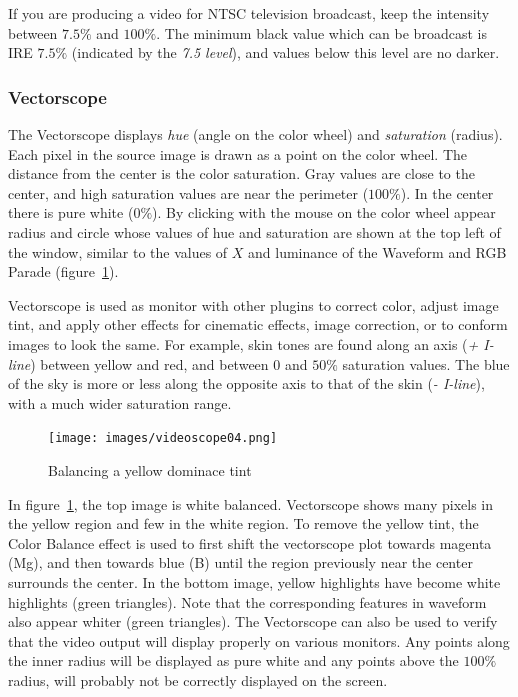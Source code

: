 {If you are producing a video for NTSC television broadcast, keep the intensity between $7.5\%$ and $100\%$. The minimum black value which can be broadcast is IRE $7.5\%$ (indicated by the \textit{7.5 level}), and values below this level are no darker.

\subsubsection*{Vectorscope}%
\label{ssub:Vectorscope}

The Vectorscope displays \textit{hue} (angle on the color wheel) and \textit{saturation} (radius). Each pixel in the source image is drawn as a point on the color wheel. The distance from the center is the color saturation. Gray values are close to the center, and high saturation values are near the perimeter ($100\%$). In the center there is pure white ($0\%$). By clicking with the mouse on the color wheel appear radius and circle whose values of hue and saturation are shown at the top left of the window, similar to the values of $X$ and luminance of the Waveform and RGB Parade (figure~\ref{fig:videoscope04}).

Vectorscope is used as monitor with other plugins to correct color, adjust image tint, and apply other effects for cinematic effects, image correction, or to conform images to look the same. For example, skin tones are found along an axis (\textit{+ I-line}) between yellow and red, and between $0$ and $50\%$ saturation values. The blue of the sky is more or less along the opposite axis to that of the skin (\textit{- I-line}), with a much wider saturation range.

\begin{figure}[hbtp]
    \centering
    \texttt{[image: images/videoscope04.png]}
    \caption{Balancing a yellow dominace tint}
    \label{fig:videoscope04}
\end{figure}

In figure~\ref{fig:videoscope04}, the top image is white balanced. Vectorscope shows many pixels in the yellow region and few in the white region. To remove the yellow tint, the Color Balance effect is used to first shift the vectorscope plot towards magenta (Mg), and then towards blue (B) until the region previously near the center surrounds the center. In the bottom image, yellow highlights have become white highlights (green triangles). Note that the corresponding features in waveform also appear whiter (green triangles).
The Vectorscope can also be used to verify that the video output will display properly on various monitors. Any points along the inner radius will be displayed as pure white and any points above the $100\%$ radius, will probably not be correctly displayed on the screen.

}
